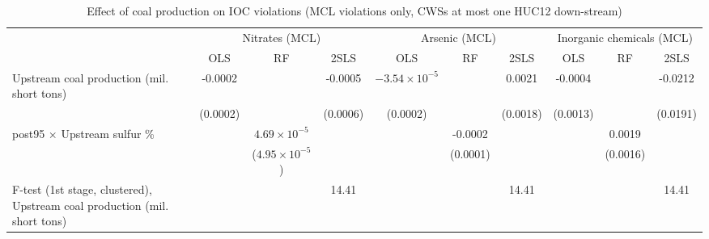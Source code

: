 
\begin{table}[htbp]
   
   \caption{\label{2sls_dwnstrm_minevio_mcl_ivsumcoaltons_binvio} Effect of coal production on IOC violations (MCL violations only, CWSs at most one HUC12 down-stream)}
   \bigskip
   
   \centering
   
   \begin{adjustbox}{width = \textwidth, center}
      
      
      \begin{tabular}{lccccccccc}
         \toprule
         
          & \multicolumn{3}{c}{Nitrates (MCL)} & \multicolumn{3}{c}{Arsenic (MCL)} & \multicolumn{3}{c}{Inorganic chemicals (MCL)}\\
         
                                                                                   & OLS           & RF                      & 2SLS          & OLS                    & RF            & 2SLS          & OLS           & RF            & 2SLS\\  
         
         \midrule 
         Upstream coal production (mil. short tons)                                & -0.0002       &                         & -0.0005       & $-3.54\times 10^{-5}$  &               & 0.0021        & -0.0004       &               & -0.0212\\   
                                                                                   & (0.0002)      &                         & (0.0006)      & (0.0002)               &               & (0.0018)      & (0.0013)      &               & (0.0191)\\   
         post95 $\times$ Upstream sulfur \%                                        &               & $4.69\times 10^{-5}$    &               &                        & -0.0002       &               &               & 0.0019        &   \\   
                                                                                   &               & ($4.95\times 10^{-5}$)  &               &                        & (0.0001)      &               &               & (0.0016)      &   \\   
         
         F-test (1st stage, clustered), Upstream coal production (mil. short tons) &               &                         & 14.41         &                        &               & 14.41         &               &               & 14.41\\  
         

\end{tabular}
\end{adjustbox}
\end{table}
